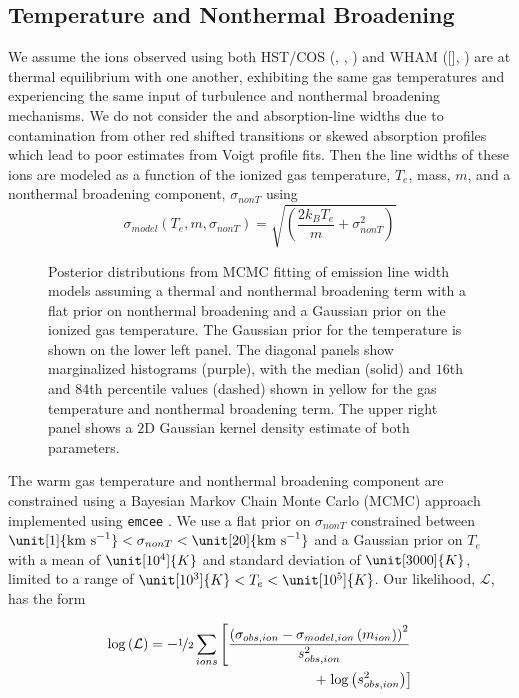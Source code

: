 \documentclass[twocolumn]{aastex63}
\newcommand{\nii}{\ion{N}{2}}
\newcommand{\kms}{\mathrm{km~s}\ensuremath{^{-1}}}
\begin{document}
\subsection{Temperature and Nonthermal Broadening}
We assume the ions observed using both HST/COS (, , ) and WHAM ([\nii], ) are at thermal equilibrium with one another, exhibiting the same gas temperatures and experiencing the same input of turbulence and nonthermal broadening mechanisms. We do not consider the  and  absorption-line widths due to contamination from other red shifted transitions or skewed absorption profiles which lead to poor estimates from Voigt profile fits. Then the line widths of these ions are modeled as a function of the ionized gas temperature, $T_e$, mass, $m$, and a nonthermal broadening component, $\sigma_{nonT}$ using
\begin{equation}
\sigma_{model}\left(T_e, m, \sigma_{nonT}\right) = \sqrt{\left(\frac{2 k_B T_e}{m} + \sigma_{nonT}^2 \right)}
\end{equation}

\begin{figure}[h]
\caption{Posterior distributions from MCMC fitting of emission line width models assuming a thermal and nonthermal broadening term with a flat prior on nonthermal broadening and a Gaussian prior on the ionized gas temperature. The Gaussian prior for the temperature is shown on the lower left panel. The diagonal panels show marginalized histograms (purple), with the median (solid) and $16$th and $84$th percentile values (dashed) shown in yellow for the gas temperature and nonthermal broadening term. The upper right panel shows a $2$D Gaussian kernel density estimate of both parameters.  \label{fig:MCMC_lineWidths}}
\end{figure}

The warm gas temperature and nonthermal broadening component are constrained using a Bayesian Markov Chain Monte Carlo (MCMC) approach implemented using \texttt{emcee} \citep{emcee}. We use a flat prior on $\sigma_{nonT}$ constrained between $\unit[1]{\kms} < \sigma_{nonT} < \unit[20]{\kms}$ and a Gaussian prior on $T_e$ with a mean of $\unit[10^4]{K}$ and standard deviation of $\unit[3000]{K}$, limited to a range of $\unit[10^3]{K} < T_e < \unit[10^5]{K}$. Our likelihood, $\mathcal{L}$, has the form

\begin{equation} \label{loglike}
\begin{split}
\log{\left(\mathcal{L}\right)} = -\nicefrac{1}{2} \sum_{ions}\left[\frac{\left(\sigma_{obs,ion} - \sigma_{model,ion}\left( m_{ion} \right) \right)^2}{s_{obs,ion}^2}\right. \\
+ \left.\log{\left(s_{obs,ion}^2 \right)}\right]
\end{split}
\end{equation}
\end{document}
